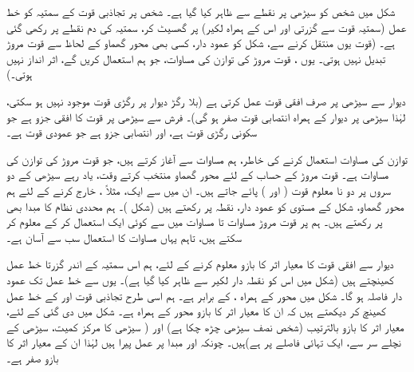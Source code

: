 \quad
شکل  میں  شخص کو سیڑھی پر نقطے سے ظاہر کیا گیا ہے۔ شخص  پر تجاذبی قوت   کے سمتیہ کو خط عمل (سمتیہ قوت سے گزرتی  اور اس کے ہمراہ لکیر)  پر گھسیٹ کر، سمتیہ کی دم  نقطے پر رکھی گئی ہے۔ (قوت یوں منتقل کرنے سے، شکل کو عمود دار،  کسی بھی محور گھماو کے لحاظ سے قوت مروڑ تبدیل نہیں ہوتی۔ یوں ، قوت مروڑ کی   توازن  کی مساوات، جو ہم استعمال کریں گے،  اثر انداز نہیں ہوتی۔)

دیوار سے سیڑھی پر صرف افقی قوت  عمل کرتی ہے (بلا رگڑ دیوار پر رگڑی قوت موجود نہیں ہو سکتی، لہٰذا  سیڑھی پر دیوار کے ہمراہ انتصابی قوت صفر ہو گی)۔ فرش سے سیڑھی پر  قوت  کا  افقی جزو  ہے جو سکونی رگڑی قوت ہے، اور انتصابی جزو   ہے  جو عمودی قوت ہے۔

توازن کی مساوات  استعمال کرنے کی خاطر،  ہم مساوات      سے آغاز کرتے ہیں، جو  قوت مروڑ کی توازن کی مساوات  ہے۔ قوت مروڑ کے حساب کے لئے محور گھماو منتخب کرتے وقت، یاد رہے سیڑھی کے دو سروں
 پر دو  نا معلوم  قوت ( اور ) پائے جاتے ہیں۔ ان میں سے ایک، مثلاً ، خارج کرنے کے لئے ہم محور گھماو، شکل کے مستوی کو عمود دار، نقطہ  پر رکھتے ہیں (شکل )۔ ہم محددی نظام کا مبدا بھی  پر رکھتے ہیں۔
  ہم   پر قوت مروڑ مساوات  تا مساوات   میں سے کوئی ایک استعمال کر کے معلوم کر سکتے ہیں، تاہم  یہاں مساوات    کا استعمال  سب سے آسان ہے۔ 
  
  دیوار سے افقی قوت  کا معیار اثر کا بازو  معلوم کرنے کے لئے، ہم اس سمتیہ  کے اندر گزرتا خط عمل کھینچتے ہیں (شکل  میں  اس کو نقطہ دار لکیر سے ظاہر کیا گیا ہے)۔ یوں  سے خط عمل تک عمود دار فاصلہ  ہو گا۔  شکل  میں      محور  کے ہمراہ ،  کے برابر ہے۔ ہم اسی طرح تجاذبی قوت  اور   کے خط عمل کھینچ کر دیکھتے ہیں کہ ان کا معیار اثر کا بازو محور  کے ہمراہ ہے۔ شکل  میں دی گئی  کے لئے، معیار اثر کا بازو بالترتیب   (شخص نصف سیڑھی چڑھ چکا ہے) اور   ( سیڑھی کا مرکز کمیت، سیڑھی کے نچلے سر سے،   ایک تہائی فاصلے پر ہے)ہیں۔ چونکہ  اور   مبدا پر عمل پیرا ہیں لہٰذا ان کے معیار اثر کا بازو صفر ہے۔
  

